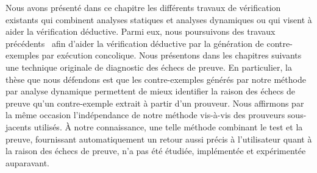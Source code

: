 Nous avons présenté dans ce chapitre les différents travaux de vérification
existants qui combinent analyses statiques et analyses dynamiques ou qui visent
à aider la vérification déductive.
Parmi eux, nous poursuivons des travaux précédents~\cite{Chebaro/SAC12} afin
d'aider la vérification déductive par la génération de contre-exemples par
exécution concolique.
Nous présentons dans les chapitres suivants une technique originale de
diagnostic des échecs de preuve.
En particulier, la thèse que nous défendons est que les contre-exemples générés
par notre méthode par analyse dynamique permettent de mieux identifier la raison
des échecs de preuve qu'un contre-exemple extrait à partir d'un prouveur.
Nous affirmons par la même occasion l'indépendance de notre méthode vis-à-vis
des prouveurs sous-jacents utilisés.
À notre connaissance, une telle méthode combinant le test et la preuve,
fournissant automatiquement un retour aussi précis à l'utilisateur quant à la
raison des échecs de preuve, n'a pas été étudiée, implémentée et expérimentée
auparavant.
